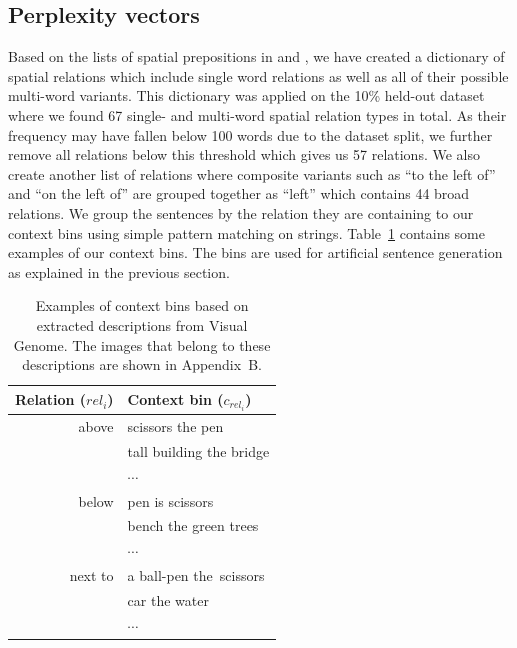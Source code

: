 \subsection{Perplexity vectors}\label{splu2019:sec:contextbins}
Based on the lists of spatial prepositions in \citep{Landau:1996aa} and
\citep{herskovits1986language}, we have created a dictionary of spatial relations
which include single word relations as well as all of their possible multi-word
variants. This dictionary was applied on the 10\% held-out dataset where we
found 67 single- and multi-word spatial relation types in total. As their
frequency may have fallen below 100 words due to the dataset split, we further
remove all relations below this threshold which gives us 57 relations.
We also create another list of relations where composite variants such as ``to
the left of'' and ``on the left of'' are grouped together as ``left'' which
contains 44 broad relations.
We group the sentences by the relation they are containing to our
context bins using simple pattern matching on
strings. Table~\ref{splu2019:tab:buckets} contains some examples of our context
bins. The bins are used for artificial sentence generation as
explained in the previous section.

\begin{table}[ht]
    \centering
    \begin{tabular}{r|l}
      Relation ($rel_i$)  & Context bin ($c_{rel_i}$)\\
      \hline
      above     & scissors \underline{\hspace{1.1cm}} the pen \\
                & tall building \underline{\hspace{1.1cm}} the bridge \\
                & $\cdots$\\
      \hline
      below     & pen is \underline{\hspace{1.1cm}} scissors \\
                & bench \underline{\hspace{1.1cm}} the green trees \\
                & $\cdots$\\
      \hline
      next to   & a ball-pen \underline{\hspace{1.1cm}} the~scissors \\
                & car \underline{\hspace{1.1cm}} the water \\
                & $\cdots$\\
    \end{tabular}
	\vspace{0.5em}
    \caption{Examples of context bins based on extracted descriptions from Visual Genome. The images that belong to these descriptions are shown in %
	Appendix~B.
	}\label{splu2019:tab:buckets}
\end{table}


